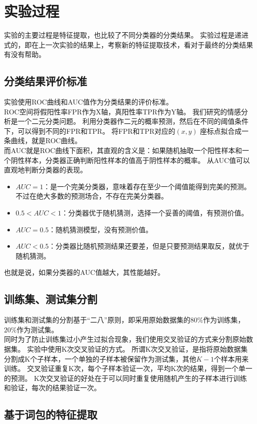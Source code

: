 \section{实验过程}
实验的主要过程是特征提取，也比较了不同分类器的分类结果。
实验过程是递进式的，即在上一次实验的结果上，考察新的特征提取技术，看对于最终的分类结果有没有帮助。\\
\subsection{分类结果评价标准}
实验使用ROC曲线和AUC值作为分类结果的评价标准。\\
ROC空间将假阳性率FPR作为X轴，真阳性率TPR作为Y轴。
我们研究的情感分析是一个二元分类问题。
利用分类器作二元的概率预测，然后在不同的阈值条件下，可以得到不同的FPR和TPR。
将FPR和TPR对应的$ (x, y) $ 座标点拟合成一条曲线，就是ROC曲线。\\
而AUC就是ROC曲线下面积，其直观的含义是：如果随机抽取一个阳性样本和一个阴性样本，分类器正确判断阳性样本的值高于阴性样本的概率。
从AUC值可以直观地判断分类器的表现。
\begin{itemize}
	\item
	  $ AUC = 1 $：是一个完美分类器，意味着存在至少一个阈值能得到完美的预测。不过在绝大多数的预测场合，不存在完美分类器。
	\item
	  $ 0.5 < AUC < 1 $：分类器优于随机猜测，选择一个妥善的阈值，有预测价值。
	\item
	  $ AUC = 0.5 $：随机猜测模型，没有预测价值。
	\item
	  $ AUC < 0.5 $：分类器比随机预测结果还要差，但是只要预测结果取反，就优于随机猜测。
\end{itemize}
也就是说，如果分类器的AUC值越大，其性能越好。

\subsection{训练集、测试集分割}
训练集和测试集的分割基于“二八”原则，即采用原始数据集的$ 80\% $作为训练集，$ 20\% $作为测试集。\\
同时为了防止训练集过小产生过拟合现象，我们使用交叉验证的方式来分割原始数据集。
实验中使用K次交叉验证的方式。
所谓K次交叉验证，是指将原始数据集分割成K个子样本，一个单独的子样本被保留作为测试集，其他$ K-1 $个样本用来训练。
交叉验证重复K次，每个子样本验证一次，平均K次的结果，得到一个单一的预测。
K次交叉验证的好处在于可以同时重复使用随机产生的子样本进行训练和验证，每次的结果验证一次。

\subsection{基于词包的特征提取}
